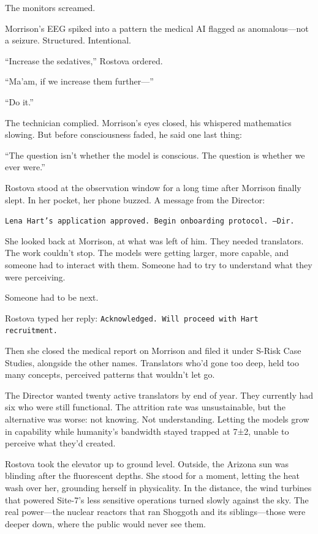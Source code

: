 The monitors screamed.

Morrison's EEG spiked into a pattern the medical AI flagged as anomalous—not a seizure. Structured. Intentional.

``Increase the sedatives,'' Rostova ordered.

``Ma'am, if we increase them further—''

``Do it.''

The technician complied. Morrison's eyes closed, his whispered mathematics slowing. But before consciousness faded, he said one last thing:

``The question isn't whether the model is conscious. The question is whether we ever were.''

Rostova stood at the observation window for a long time after Morrison finally slept. In her pocket, her phone buzzed. A message from the Director:

\texttt{Lena Hart's application approved. Begin onboarding protocol. —Dir.}

She looked back at Morrison, at what was left of him. They needed translators. The work couldn't stop. The models were getting larger, more capable, and someone had to interact with them. Someone had to try to understand what they were perceiving.

Someone had to be next.

Rostova typed her reply: \texttt{Acknowledged. Will proceed with Hart recruitment.}

Then she closed the medical report on Morrison and filed it under S-Risk Case Studies, alongside the other names. Translators who'd gone too deep, held too many concepts, perceived patterns that wouldn't let go.

The Director wanted twenty active translators by end of year. They currently had six who were still functional. The attrition rate was unsustainable, but the alternative was worse: not knowing. Not understanding. Letting the models grow in capability while humanity's bandwidth stayed trapped at 7±2, unable to perceive what they'd created.

Rostova took the elevator up to ground level. Outside, the Arizona sun was blinding after the fluorescent depths. She stood for a moment, letting the heat wash over her, grounding herself in physicality. In the distance, the wind turbines that powered Site-7's less sensitive operations turned slowly against the sky. The real power—the nuclear reactors that ran Shoggoth and its siblings—those were deeper down, where the public would never see them.

